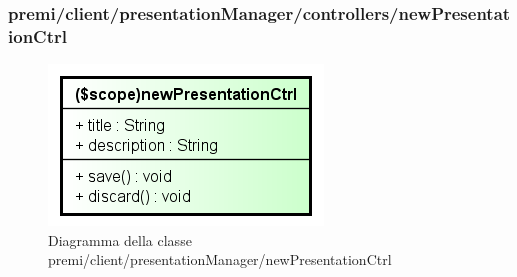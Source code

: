 \subsubsection{premi/client/presentationManager/controllers/newPresentationCtrl}
\begin{figure}[h]
\begin{center}
\includegraphics[scale=0.90]{img/diacla/newPresentationCtrl.png}
\caption{Diagramma della classe premi/client/presentationManager/newPresentationCtrl}
\end{center}
\end{figure}




